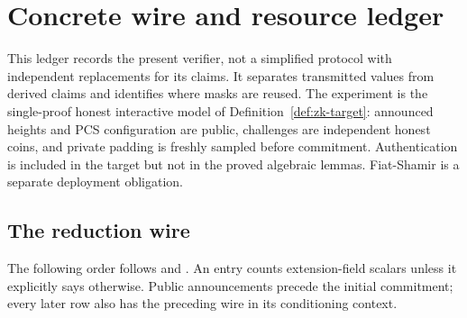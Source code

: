 \section{Concrete wire and resource ledger}\label{sec:zk-wire-ledger}

This ledger records the present verifier, not a simplified protocol with independent replacements for its claims. It separates transmitted values from derived claims and identifies where masks are reused. The experiment is the single-proof honest interactive model of Definition~\ref{def:zk-target}: announced heights and PCS configuration are public, challenges are independent honest coins, and private padding is freshly sampled before commitment. Authentication is included in the target but not in the proved algebraic lemmas. Fiat-Shamir is a separate deployment obligation.

\subsection{The reduction wire}

The following order follows  and . An entry counts extension-field scalars unless it explicitly says otherwise. Public announcements precede the initial commitment; every later row also has the preceding wire in its conditioning context.


